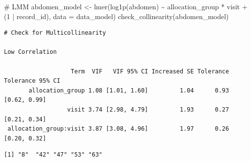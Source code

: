 \documentclass[
  12pt,
]{article}
\newenvironment{Shaded}{\begin{snugshade}}{\end{snugshade}}
\newcommand{\AttributeTok}[1]{\textcolor[rgb]{0.40,0.45,0.13}{#1}}
\newcommand{\CommentTok}[1]{\textcolor[rgb]{0.37,0.37,0.37}{#1}}
\newcommand{\DecValTok}[1]{\textcolor[rgb]{0.68,0.00,0.00}{#1}}
\newcommand{\FunctionTok}[1]{\textcolor[rgb]{0.28,0.35,0.67}{#1}}
\newcommand{\NormalTok}[1]{\textcolor[rgb]{0.00,0.23,0.31}{#1}}
\newcommand{\OtherTok}[1]{\textcolor[rgb]{0.00,0.23,0.31}{#1}}
\newcommand{\SpecialCharTok}[1]{\textcolor[rgb]{0.37,0.37,0.37}{#1}}
\newcommand{\StringTok}[1]{\textcolor[rgb]{0.13,0.47,0.30}{#1}}
\begin{document}
\begin{Shaded}
\begin{Highlighting}[]
\CommentTok{\# LMM}
\NormalTok{abdomen\_model }\OtherTok{\textless{}{-}} \FunctionTok{lmer}\NormalTok{(}\FunctionTok{log1p}\NormalTok{(abdomen) }\SpecialCharTok{\textasciitilde{}}\NormalTok{ allocation\_group }\SpecialCharTok{*}\NormalTok{ visit }\SpecialCharTok{+} 
\NormalTok{(}\DecValTok{1} \SpecialCharTok{|}\NormalTok{ record\_id), }\AttributeTok{data =}\NormalTok{ data\_model)}
\FunctionTok{check\_collinearity}\NormalTok{(abdomen\_model)}
\end{Highlighting}
\end{Shaded}

\begin{verbatim}
# Check for Multicollinearity

Low Correlation

                   Term  VIF   VIF 95% CI Increased SE Tolerance Tolerance 95% CI
       allocation_group 1.08 [1.01, 1.60]         1.04      0.93     [0.62, 0.99]
                  visit 3.74 [2.98, 4.79]         1.93      0.27     [0.21, 0.34]
 allocation_group:visit 3.87 [3.08, 4.96]         1.97      0.26     [0.20, 0.32]
\end{verbatim}

\begin{Shaded}
\end{Shaded}

\begin{verbatim}
[1] "8"  "42" "47" "53" "63"
\end{verbatim}
\end{document}
